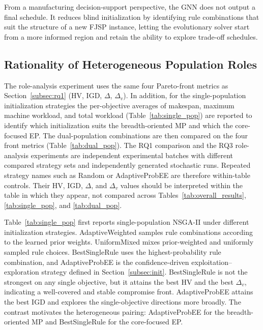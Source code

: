 \documentclass[pdflatex,iicol,Numbered,sn-basic]{sn-jnl}
\begin{document}
From a manufacturing decision-support perspective, the GNN does not output a final schedule. It reduces blind initialization by identifying rule combinations that suit the structure of a new FJSP instance, letting the evolutionary solver start from a more informed region and retain the ability to explore trade-off schedules.




\subsection{Rationality of Heterogeneous Population Roles}\label{subsec:rq3}
The role-analysis experiment uses the same four Pareto-front metrics as Section~\ref{subsec:rq1} (HV, IGD, $\Delta$, $\Delta_v$). In addition, for the single-population initialization strategies the per-objective averages of makespan, maximum machine workload, and total workload (Table~\ref{tab:single_pop}) are reported to identify which initialization suits the breadth-oriented MP and which the core-focused EP. The dual-population combinations are then compared on the four front metrics (Table~\ref{tab:dual_pop}).
The RQ1 comparison and the RQ3 role-analysis experiments are independent experimental batches with different compared strategy sets and independently generated stochastic runs. Repeated strategy names such as Random or AdaptiveProbEE are therefore within-table controls. Their HV, IGD, $\Delta$, and $\Delta_v$ values should be interpreted within the table in which they appear, not compared across Tables~\ref{tab:overall_results}, \ref{tab:single_pop}, and \ref{tab:dual_pop}.

Table~\ref{tab:single_pop} first reports single-population NSGA-II under different initialization strategies. AdaptiveWeighted samples rule combinations according to the learned prior weights. UniformMixed mixes prior-weighted and uniformly sampled rule choices. BestSingleRule uses the highest-probability rule combination, and AdaptiveProbEE is the confidence-driven exploitation--exploration strategy defined in Section~\ref{subsec:init}. BestSingleRule is not the strongest on any single objective, but it attains the best HV and the best $\Delta_v$, indicating a well-covered and stable compromise front. AdaptiveProbEE attains the best IGD and explores the single-objective directions more broadly. The contrast motivates the heterogeneous pairing: AdaptiveProbEE for the breadth-oriented MP and BestSingleRule for the core-focused EP.
\end{document}
